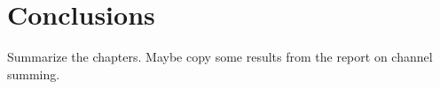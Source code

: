 \chapter{Conclusions}

Summarize the chapters. Maybe copy some results from the report on channel
summing.
